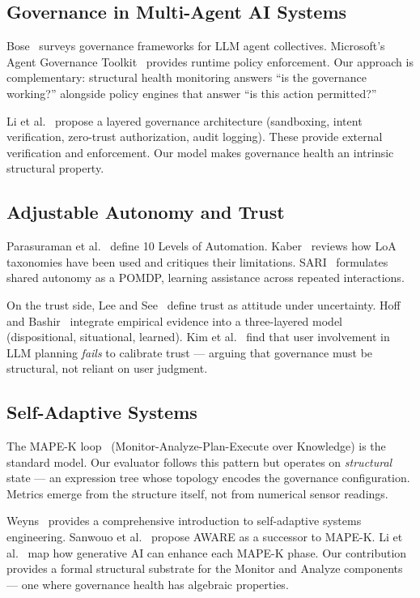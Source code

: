 \documentclass[sigconf,nonacm]{acmart}
\begin{document}
\subsection{Governance in Multi-Agent AI Systems}

Bose~\cite{bose} surveys governance frameworks for LLM agent
collectives. Microsoft's Agent Governance Toolkit~\cite{microsoft}
provides runtime policy enforcement. Our approach is complementary:
structural health monitoring answers ``is the governance working?''
alongside policy engines that answer ``is this action permitted?''

Li et al.~\cite{liarch} propose a layered governance architecture
(sandboxing, intent verification, zero-trust authorization, audit
logging). These provide external verification and enforcement. Our
model makes governance health an intrinsic structural property.

\subsection{Adjustable Autonomy and Trust}

Parasuraman et al.~\cite{parasuraman} define 10 Levels of Automation.
Kaber~\cite{kaber} reviews how LoA taxonomies have been used and
critiques their limitations. SARI~\cite{sari} formulates shared
autonomy as a POMDP, learning assistance across repeated interactions.

On the trust side, Lee and See~\cite{leesee} define trust as attitude
under uncertainty. Hoff and Bashir~\cite{hoffbashir} integrate
empirical evidence into a three-layered model (dispositional,
situational, learned). Kim et al.~\cite{kim} find that user involvement
in LLM planning \emph{fails} to calibrate trust --- arguing that
governance must be structural, not reliant on user judgment.

\subsection{Self-Adaptive Systems}

The MAPE-K loop~\cite{mapek} (Monitor-Analyze-Plan-Execute over
Knowledge) is the standard model. Our evaluator follows this pattern but
operates on \emph{structural} state --- an expression tree whose
topology encodes the governance configuration. Metrics emerge from the
structure itself, not from numerical sensor readings.

Weyns~\cite{weyns} provides a comprehensive introduction to
self-adaptive systems engineering. Sanwouo et al.~\cite{aware} propose
AWARE as a successor to MAPE-K. Li et al.~\cite{ligen} map how
generative AI can enhance each MAPE-K phase. Our contribution provides
a formal structural substrate for the Monitor and Analyze
components --- one where governance health has algebraic properties.
\end{document}

